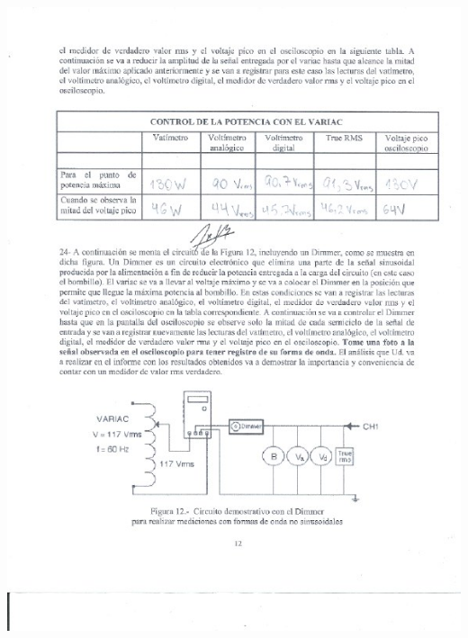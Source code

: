 \documentclass[12pt]{article}
\begin{document}
	\includegraphics[width=16cm,height=21cm]{Img/Resultados_9}\\
\end{document}
